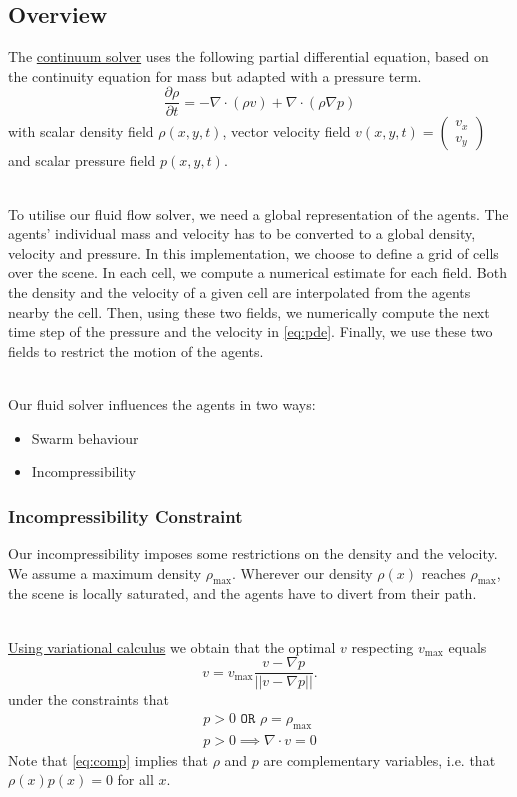 \documentclass{article}
\begin{document}
\subsection{Overview}
The \underline{continuum solver} uses the following partial differential equation, based on the continuity equation for mass but adapted with a pressure term.
\begin{equation}\label{eq:pde}
\frac{\partial \rho}{\partial t} =-\nabla \cdot(\rho{v}) + \nabla \cdot (\rho\nabla p)
\end{equation}
with scalar density field $\rho(x,y,t)$, vector velocity field $v(x,y,t) = \begin{pmatrix}v_x\\v_y\end{pmatrix}$ and scalar pressure field $p(x,y,t)$.

\ \\
To utilise our fluid flow solver, we need a global representation of the agents. The agents' individual mass and velocity has to be converted to a global density, velocity and pressure. In this implementation, we choose to define a grid of cells over the scene. In each cell, we compute a numerical estimate for each field. Both the density and the velocity of a given cell are interpolated from the agents nearby the cell. Then, using these two fields, we numerically compute the next time step of the pressure and the velocity in \eqref{eq:pde}. Finally, we use these two fields to restrict the motion of the agents.

\ \\
Our fluid solver influences the agents in two ways: 
\begin{itemize}
\item Swarm behaviour
\item Incompressibility
\end{itemize}
\subsubsection{Incompressibility Constraint}
Our incompressibility imposes some restrictions on the density and the velocity. We assume a maximum density $\rho_{\max}$. Wherever our density $\rho(x)$ reaches $\rho_{\max}$, the scene is locally saturated, and the agents have to divert from their path. 

\ \\
\underline{Using variational calculus} we obtain that the optimal $v$ respecting $v_{\max}$ equals $$v = v_{\max}\frac{v-\nabla p}{||v-\nabla p||}.$$
under the constraints that 
\begin{align}
\label{eq:comp}
p>0 \texttt{ OR } \rho=\rho_{\max}\\
p>0 \implies \nabla\cdot v=0
\end{align}
Note that \eqref{eq:comp} implies that $\rho$ and $p$ are complementary variables, i.e. that $\rho(x)p(x)=0$ for all $x$.
\end{document}
